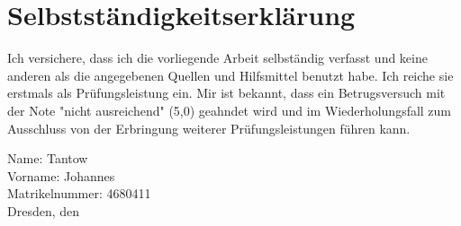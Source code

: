 \chapter*{Selbstständigkeitserklärung}

Ich versichere, dass ich die vorliegende Arbeit selbständig verfasst und keine
anderen als die angegebenen Quellen und Hilfsmittel benutzt habe. Ich reiche sie
erstmals als Prüfungsleistung ein. Mir ist bekannt, dass ein Betrugsversuch mit der
Note "nicht ausreichend" (5,0) geahndet wird und im Wiederholungsfall zum
Ausschluss von der Erbringung weiterer Prüfungsleistungen führen kann.

\noindent Name: Tantow \\
Vorname: Johannes \\
Matrikelnummer: 4680411 \\

Dresden, den